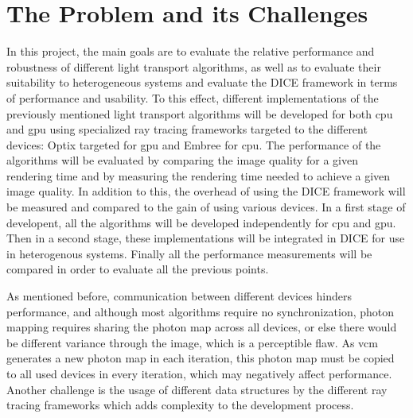 \chapter{The Problem and its Challenges}

In this project, the main goals are to evaluate the relative performance and robustness of different light transport algorithms, as well as to evaluate their suitability to heterogeneous systems and evaluate the DICE framework in terms of performance and usability. To this effect, different implementations of the previously mentioned light transport algorithms will be developed for both \gls{cpu} and \gls{gpu} using specialized ray tracing frameworks targeted to the different devices: Optix targeted for \gls{gpu} and Embree for \gls{cpu}. The performance of the algorithms will be evaluated by comparing the image quality for a given rendering time and by measuring the rendering time needed to achieve a given image quality. In addition to this, the overhead of using the DICE framework will be measured and compared to the gain of using various devices. In a first stage of developent, all the algorithms will be developed independently for \gls{cpu} and \gls{gpu}. Then in a second stage, these implementations will be integrated in DICE for use in heterogenous systems. Finally all the performance measurements will be compared in order to evaluate all the previous points.

As mentioned before, communication between different devices hinders performance, and although most algorithms require no synchronization, photon mapping requires sharing the photon map across all devices, or else there would be different variance through the image, which is a perceptible flaw. As \gls{vcm} generates a new photon map in each iteration, this photon map must be copied to all used devices in every iteration, which may negatively affect performance. Another challenge is the usage of different data structures by the different ray tracing frameworks which adds complexity to the development process.

